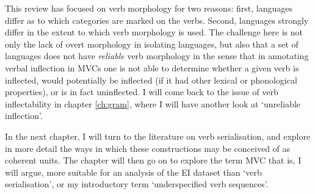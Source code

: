 This review has focused on verb morphology for two reasons: first, languages differ as to which categories are marked on the verbs. Second, languages strongly differ in the extent to which verb morphology is used. The challenge here is not only the lack of overt morphology in isolating languages, but also that a set of languages does not have \emph{reliable} verb morphology in the sense that in annotating verbal inflection in MVCs one is not able to determine whether a given verb is inflected, would potentially be inflected (if it had other lexical or phonological properties), or is in fact uninflected. I will come back to the issue of verb inflectability in chapter \ref{ch:gram}, where I will have another look at `unreliable inflection'.

In the next chapter, I will turn to the literature on verb serialisation, and explore in more detail the ways in which these constructions may be conceived of as coherent units. The chapter will then go on to explore the term MVC that is, I will argue, more suitable  for an analysis of the EI dataset than `verb serialisation', or my introductory term `underspecified verb sequences'.